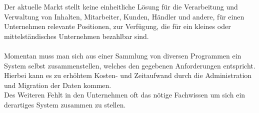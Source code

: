 Der aktuelle Markt stellt keine einheitliche Lösung für die Verarbeitung und Verwaltung von Inhalten, Mitarbeiter, Kunden, Händler und andere, für einen Unternehmen relevante Positionen, zur Verfügung, die für ein kleines oder mittelständisches Unternehmen bezahlbar sind.\\
\\
Momentan muss man sich aus einer Sammlung von diversen Programmen ein System selbst zusammenstellen, welches den gegebenen Anforderungen entspricht.\\
Hierbei kann es zu erhöhtem Kosten- und Zeitaufwand durch die Administration und Migration der Daten kommen.\\
Des Weiteren Fehlt in den Unternehmen oft das nötige Fachwissen um sich ein derartiges System zusammen zu stellen.
